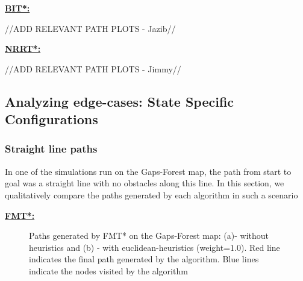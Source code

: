 \documentclass{article}
\newcommand*{\varfont}{\fontfamily{pcr}\selectfont}
\begin{document}
\textbf{\underline{BIT*:}}

//ADD RELEVANT PATH PLOTS - Jazib//

\textbf{\underline{NRRT*:}}

//ADD RELEVANT PATH PLOTS - Jimmy//

\subsection{Analyzing edge-cases: State Specific Configurations}

\subsubsection{Straight line paths}

In one of the simulations run on the Gaps-Forest map, the path from {\varfont start} to {\varfont goal} was a straight line with no obstacles along this line. In this section, we qualitatively compare the paths generated by each algorithm in such a scenario

\textbf{\underline{FMT*:}}

\begin{figure}[H]
	\caption{Paths generated by FMT* on the Gaps-Forest map: (a)- without heuristics and (b) - with euclidean-heuristics (weight=1.0). Red line indicates the final path generated by the algorithm. Blue lines indicate the nodes visited by the algorithm}
	\label{fmt:nsamples}
\end{figure}
\end{document}
